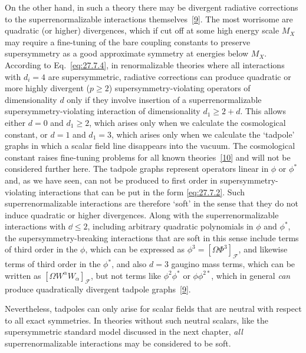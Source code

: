 On the other hand, in such a theory there may be divergent radiative
corrections to the superrenormalizable interactions
themselves~\hyperref[ch27-ref-9]{[9]}. The most worrisome are quadratic (or
higher) divergences, which if cut off at some high energy scale \(M_X\) may
require a fine-tuning of the bare coupling constants to preserve
supersymmetry as a good approximate symmetry at energies below \(M_X\).
According to Eq.~\eqref{eq:27.7.4}, in renormalizable theories where all
interactions with \(d_i=4\) are supersymmetric, radiative corrections can
produce quadratic or more highly divergent (\(p\geq2\))
supersymmetry-violating operators of dimensionality \(d\) only if they
involve insertion of a superrenormalizable supersymmetry-violating
interaction of dimensionality \(d_1\geq2+d\). This allows either \(d=0\)
and \(d_1\geq2\), which arises only when we calculate the cosmological
constant, or \(d=1\) and \(d_1=3\), which arises only when we calculate the
`tadpole' graphs in which a scalar field line disappears into the vacuum.
The cosmological constant raises fine-tuning problems for all known
theories~\hyperref[ch27-ref-10]{[10]} and will not be considered further
here. The tadpole graphs represent operators linear in \(\phi\) or \(\phi^*\)
and, as we have seen, can not be produced to first order in
supersymmetry-violating interactions that can be put in the form
\eqref{eq:27.7.2}. Such superrenormalizable interactions are therefore
`soft' in the sense that they do not induce quadratic or higher divergences.
Along with the superrenormalizable interactions with \(\dd\leq2\), including
arbitrary quadratic polynomials in \(\phi\) and \(\phi^*\), the
supersymmetry-breaking interactions that are soft in this sense include
terms of third order in the \(\phi\), which can be expressed as
\(\phi^3=[\Omega\Phi^3]_{\mathcal{F}}\), and likewise terms of third order
in the \(\phi^*\), and also \(d=3\) gaugino mass terms, which can be written
as \([\Omega W^\alpha W_\alpha]_{\mathcal{F}}\), but
not terms like \(\phi^2\phi^*\) or \(\phi\phi^{2*}\), which in general
\emph{can} produce quadratically divergent tadpole
graphs~\hyperref[ch27-ref-9]{[9]}.

Nevertheless, tadpoles can only arise for scalar fields that are neutral
with respect to all exact symmetries. In theories without such neutral
scalars, like the supersymmetric standard model discussed in the next
chapter, \emph{all} superrenormalizable interactions may be considered to be
soft.

